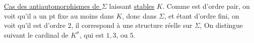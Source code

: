 \uline{Cas des antiautomorphismes de \(\Sigma\)} \inserted{\(\sigma\)} laissant \uline{stables} \(K\).  Comme  est d’ordre pair, on voit qu’il  a un pt fixe au moins dans \(K\), donc dans \(\Sigma\), et étant d’ordre fini, on voit qu’il est d’ordre \(2\), il correspond à une structure réelle sur \(\Sigma\), 
On distingue suivant le cardinal de \(K^\sigma\), qui est \(1,3\), ou \(5\).
